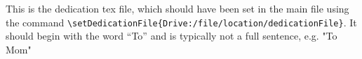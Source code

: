 This is the dedication tex file, which should have been set in the main file using the command \verb|\setDedicationFile{Drive:/file/location/dedicationFile}|. It should begin with the word “To”
and is typically not a full sentence, e.g. "To Mom"